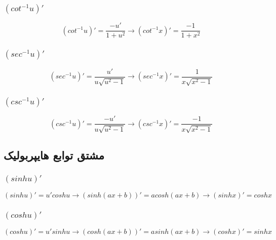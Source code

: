 \subsubsection{$(cot^{-1} u)'$}
\[ (cot^{-1} u)' = \frac{-u'}{1+u^2} \to (cot^{-1}x)' = \frac{-1}{1+x^2} \]

\subsubsection{$(sec^{-1}u)'$}
\[ (sec^{-1}u)' = \frac{u'}{u\sqrt{u^2-1}} \to (sec^{-1}x)' = \frac{1}{x\sqrt{x^2-1}} \]

\subsubsection{$(csc^{-1}u)'$}
\[ (csc^{-1}u)' = \frac{-u'}{u\sqrt{u^2-1}} \to (csc^{-1}x)' = \frac{-1}{x\sqrt{x^2-1}} \]


\subsection{مشتق توابع هایپربولیک}
\subsubsection{$(sinh u)'$}
\[ (sinh u)' = u'cosh u \to (sinh(ax+b))' = acosh(ax+b) \to (sinh x)' = cosh x \]

\subsubsection{$(cosh u)'$}
\[ (cosh u)' = u'sinh u \to (cosh(ax+b))' = asinh(ax+b) \to (cosh x)' = sinh x \]

